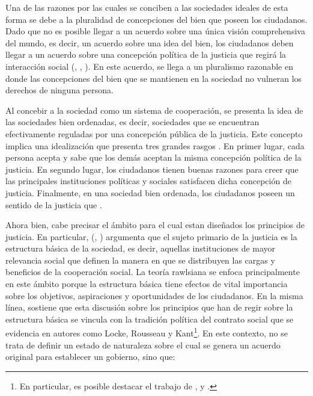 Una de las razones por las cuales se conciben a las sociedades ideales de esta forma se debe a la pluralidad de concepciones del bien que poseen los ciudadanos. Dado que no es posible llegar a un acuerdo sobre una única visión comprehensiva del mundo, es decir, un acuerdo sobre una idea del bien, los ciudadanos deben llegar a un acuerdo sobre una concepción política de la justicia que regirá la interacción social (\citeauthor{Rawls_1971}, \citeyear{Rawls_1971}, \citeyear{Rawls_2002}). En este acuerdo, se llega a un pluralismo razonable en donde las concepciones del bien que se mantienen en la sociedad no vulneran los derechos de ninguna persona. 

Al concebir a la sociedad como un sistema de cooperación, se presenta la idea de las sociedades bien ordenadas, es decir, sociedades que se encuentran efectivamente reguladas por una concepción pública de la justicia. Este concepto implica una idealización que presenta tres grandes rasgos \citep{Rawls_2002}. En primer lugar, cada persona acepta y sabe que los demás aceptan la misma concepción política de la justicia. En segundo lugar, los ciudadanos tienen buenas razones para creer que las principales instituciones políticas y sociales satisfacen dicha concepción de justicia. Finalmente, en una sociedad bien ordenada, los ciudadanos poseen un sentido de la justicia que  \citep[p. 32]{Rawls_2002}.


Ahora bien, cabe precisar el ámbito para el cual estan diseñados los principios de justicia. En particular, \citeauthor{Rawls_1971} (\citeyear{Rawls_1971}, \citeyear{Rawls_2002}) argumenta que el sujeto primario de la justicia es la estructura básica de la sociedad, es decir, aquellas instituciones de mayor relevancia social que definen la manera en que se distribuyen las cargas y beneficios de la cooperación social. La teoría rawlsiana se enfoca principalmente en este ámbito porque la estructura básica tiene efectos de vital importancia sobre los objetivos, aspiraciones y oportunidades de los ciudadanos. En la misma línea, \citet{Rawls_1971} sostiene que esta discusión sobre los principios que han de regir sobre la estructura básica se vincula con la tradición política del contrato social que se evidencia en autores como Locke, Rousseau y Kant\footnote{En particular, es posible destacar el trabajo de \citet{Locke_1960}, \citet{Rousseau_2007} y \citet{Kant_2012}.}. En este contexto, no se trata de definir un estado de naturaleza sobre el cual se genera un acuerdo original para establecer un gobierno, sino que:

